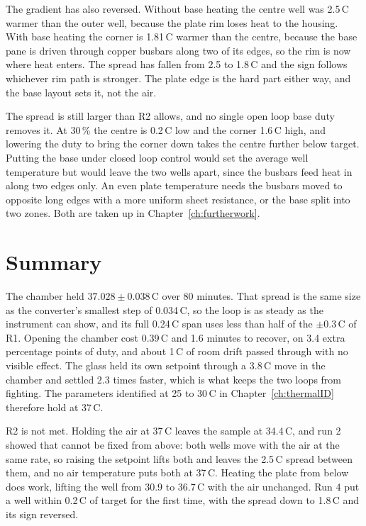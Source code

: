 The gradient has also reversed. Without base heating the centre well was 2.5\,\textdegree{}C warmer than the outer well, because the plate rim loses heat to the housing. With base heating the corner is 1.81\,\textdegree{}C warmer than the centre, because the base pane is driven through copper busbars along two of its edges, so the rim is now where heat enters. The spread has fallen from 2.5 to 1.8\,\textdegree{}C and the sign follows whichever rim path is stronger. The plate edge is the hard part either way, and the base layout sets it, not the air.

The spread is still larger than R2 allows, and no single open loop base duty removes it. At 30\,\% the centre is 0.2\,\textdegree{}C low and the corner 1.6\,\textdegree{}C high, and lowering the duty to bring the corner down takes the centre further below target. Putting the base under closed loop control would set the average well temperature but would leave the two wells apart, since the busbars feed heat in along two edges only. An even plate temperature needs the busbars moved to opposite long edges with a more uniform sheet resistance, or the base split into two zones. Both are taken up in Chapter~\ref{ch:furtherwork}.

\section{Summary}
\label{sec:cl-summary}

The chamber held $37.028 \pm 0.038$\,\textdegree{}C over 80 minutes. That spread is the same size as the converter's smallest step of 0.034\,\textdegree{}C, so the loop is as steady as the instrument can show, and its full 0.24\,\textdegree{}C span uses less than half of the $\pm$0.3\,\textdegree{}C of R1. Opening the chamber cost 0.39\,\textdegree{}C and 1.6 minutes to recover, on 3.4 extra percentage points of duty, and about 1\,\textdegree{}C of room drift passed through with no visible effect. The glass held its own setpoint through a 3.8\,\textdegree{}C move in the chamber and settled 2.3 times faster, which is what keeps the two loops from fighting. The parameters identified at 25 to 30\,\textdegree{}C in Chapter~\ref{ch:thermalID} therefore hold at 37\,\textdegree{}C.

R2 is not met. Holding the air at 37\,\textdegree{}C leaves the sample at 34.4\,\textdegree{}C, and run 2 showed that cannot be fixed from above: both wells move with the air at the same rate, so raising the setpoint lifts both and leaves the 2.5\,\textdegree{}C spread between them, and no air temperature puts both at 37\,\textdegree{}C. Heating the plate from below does work, lifting the well from 30.9 to 36.7\,\textdegree{}C with the air unchanged. Run 4 put a well within 0.2\,\textdegree{}C of target for the first time, with the spread down to 1.8\,\textdegree{}C and its sign reversed.

